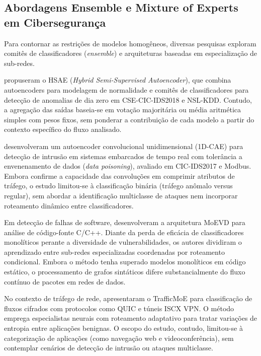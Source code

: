 \subsection{Abordagens Ensemble e Mixture of Experts em Cibersegurança}
\label{subsec:correlatos_ensemble_moe}

Para contornar as restrições de modelos homogêneos, diversas pesquisas exploram comitês de classificadores
(\emph{ensemble}) e arquiteturas baseadas em especialização de sub-redes.

 propuseram o HSAE (\emph{Hybrid Semi-Supervised Autoencoder}), que combina autoencoders para
modelagem de normalidade e comitês de classificadores para detecção de anomalias de dia zero em CSE-CIC-IDS2018 e
NSL-KDD. Contudo, a agregação das saídas baseia-se em votação majoritária ou média aritmética simples com pesos fixos,
sem ponderar a contribuição de cada modelo a partir do contexto específico do fluxo analisado.

 desenvolveram um autoencoder convolucional unidimensional (1D-CAE) para detecção de
intrusão em sistemas embarcados de tempo real com tolerância a envenenamento de dados (\emph{data poisoning}),
avaliado em CIC-IDS2017 e Modbus. Embora confirme a capacidade das convoluções em comprimir atributos de tráfego, o
estudo limitou-se à classificação binária (tráfego anômalo versus regular), sem abordar a identificação multiclasse de
ataques nem incorporar roteamento dinâmico entre classificadores.

Em detecção de falhas de software,  desenvolveram a arquitetura MoEVD para análise de
código-fonte C/C++. Diante da perda de eficácia de classificadores monolíticos perante a diversidade de
vulnerabilidades, os autores dividiram o aprendizado entre sub-redes especializadas coordenadas por roteamento
condicional. Embora o método tenha superado modelos monolíticos em código estático, o processamento de grafos
sintáticos difere substancialmente do fluxo contínuo de pacotes em redes de dados.

No contexto de tráfego de rede,  apresentaram o TrafficMoE para classificação de fluxos
cifrados com protocolos como QUIC e túneis ISCX VPN. O método emprega especialistas neurais com roteamento adaptativo
para tratar variações de entropia entre aplicações benignas. O escopo do estudo, contudo, limitou-se à categorização de
aplicações (como navegação web e videoconferência), sem contemplar cenários de detecção de intrusão ou ataques
multiclasse.

